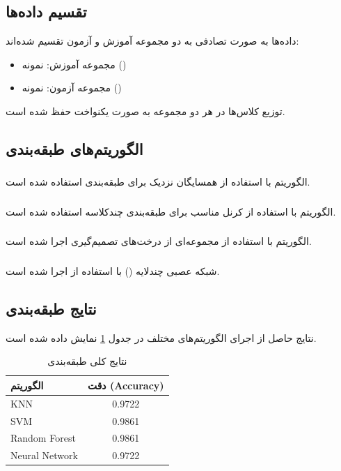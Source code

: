 \documentclass[12pt]{article}
\begin{document}
\subsection{تقسیم داده‌ها}
داده‌ها به صورت تصادفی به دو مجموعه آموزش و آزمون تقسیم شده‌اند:
\begin{itemize}
	\item مجموعه آموزش:  نمونه ()
	\item مجموعه آزمون:  نمونه ()
\end{itemize}

توزیع کلاس‌ها در هر دو مجموعه به صورت یکنواخت حفظ شده است.

\subsection{الگوریتم‌های طبقه‌بندی}

\subsubsection{}
الگوریتم  با استفاده از همسایگان نزدیک برای طبقه‌بندی استفاده شده است.

\subsubsection{}
الگوریتم  با استفاده از کرنل مناسب برای طبقه‌بندی چندکلاسه استفاده شده است.

\subsubsection{}
الگوریتم  با استفاده از مجموعه‌ای از درخت‌های تصمیم‌گیری اجرا شده است.

\subsubsection{}
شبکه عصبی چندلایه () با استفاده از  اجرا شده است.

\subsection{نتایج طبقه‌بندی}
نتایج حاصل از اجرای الگوریتم‌های مختلف در جدول \ref{tab:classification_results} نمایش داده شده است.

\begin{table}[H]
	\centering
	\caption{نتایج کلی طبقه‌بندی}
	\label{tab:classification_results}
	\begin{latin}
	\begin{tabular}{lc}
		\toprule
		الگوریتم & دقت (Accuracy) \\
		\midrule
		KNN & 0.9722 \\
		SVM & 0.9861 \\
		Random Forest & 0.9861 \\
		Neural Network & 0.9722 \\
		\bottomrule
	\end{tabular}
	\end{latin}
\end{table}
\end{document}
